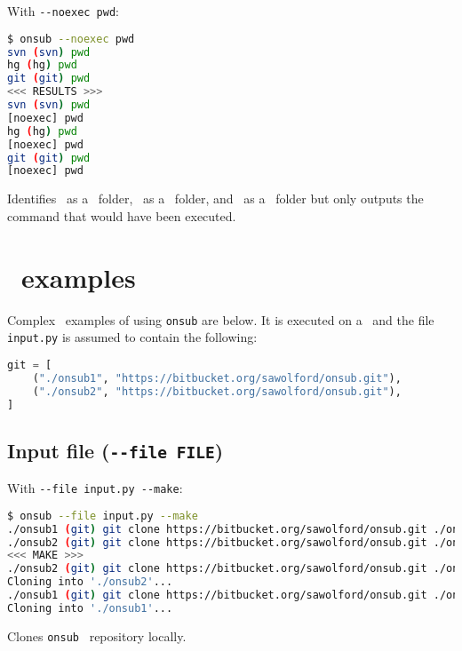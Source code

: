 With \lstinline{--noexec pwd}:

\begin{snugshade}
\begin{lstlisting}[language=bash]	
$ onsub --noexec pwd
svn (svn) pwd
hg (hg) pwd
git (git) pwd
<<< RESULTS >>>
svn (svn) pwd
[noexec] pwd
hg (hg) pwd
[noexec] pwd
git (git) pwd
[noexec] pwd
\end{lstlisting}
\end{snugshade}

Identifies \svn\ as a \Subversion\ folder, \hg\ as a \Mercurial\ folder, and \git\ as a \Git\ folder but only outputs the command that would have been executed.

\section{\Git\ examples}

Complex \Git\ examples of using \lstinline{onsub} are below. It is executed on a \Mac\ and the file \lstinline{input.py} is assumed to contain the following:

\begin{snugshade}
\begin{lstlisting}[language=python]	
git = [
	("./onsub1", "https://bitbucket.org/sawolford/onsub.git"),
	("./onsub2", "https://bitbucket.org/sawolford/onsub.git"),
]
\end{lstlisting}
\end{snugshade}

\subsection{Input file (\lstinline{--file FILE})}

With \lstinline{--file input.py --make}:

\begin{snugshade}
\begin{lstlisting}[language=bash]	
$ onsub --file input.py --make
./onsub1 (git) git clone https://bitbucket.org/sawolford/onsub.git ./onsub1
./onsub2 (git) git clone https://bitbucket.org/sawolford/onsub.git ./onsub2
<<< MAKE >>>
./onsub2 (git) git clone https://bitbucket.org/sawolford/onsub.git ./onsub2
Cloning into './onsub2'...
./onsub1 (git) git clone https://bitbucket.org/sawolford/onsub.git ./onsub1
Cloning into './onsub1'...
\end{lstlisting}
\end{snugshade}

Clones \lstinline{onsub} \Git\ repository locally.

